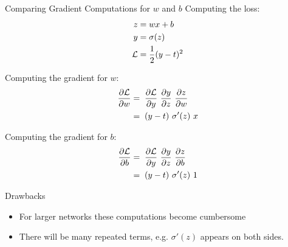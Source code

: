 \documentclass[handout,aspectratio=169]{beamer}
\begin{document}
\begin{frame}{Comparing Gradient Computations for $w$ and $b$}
  Computing the loss:\\[-13mm]
  \begin{align*}
    z &= w x + b \\
    y &= \sigma(z) \\
    {\cal L} &= \frac{1}{2} (y - t)^2 
  \end{align*}
\begin{minipage}{0.5\textwidth}
Computing the gradient for $w$:
\begin{align*}
    \frac{\partial {\cal L}}{\partial w} &=\; \frac{\partial {\cal L}}{\partial y} \,\, \frac{\partial y}{\partial z} \,\, \frac{\partial z}{\partial w}\\  &=\; (y - t) \,\, \sigma^\prime (z) \,\, x
\end{align*}
\end{minipage}\begin{minipage}{0.45\textwidth}
Computing the gradient for $b$:
\begin{align*}
    \frac{\partial {\cal L}}{\partial b} &=\; \frac{\partial {\cal L}}{\partial y} \,\, \frac{\partial y}{\partial z} \,\, \frac{\partial z}{\partial b} \\ 
&=\; (y - t) \,\, \sigma^\prime (z) \,\, 1 
\end{align*}
\end{minipage}
\begin{alertblock}{Drawbacks}
	\begin{itemize}
		\item For larger networks these computations become cumbersome
		\item There will be many repeated terms, e.g. $\sigma'(z)$ appears on both sides. 
	\end{itemize}
\end{alertblock}

\end{frame}
\end{document}

